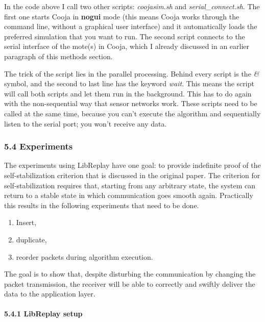 In the code above I call two other scripts: \emph{coojasim.sh} and
\emph{serial\_connect.sh}. The first one starts Cooja in \textbf{nogui}
mode (this means Cooja works through the command line, without a
graphical user interface) and it automatically loads the preferred
simulation that you want to run. The second script connects to the
serial interface of the mote(s) in Cooja, which I already discussed in
an earlier paragraph of this methods section.

The trick of the script lies in the parallel processing. Behind every
script is the \emph{\&} symbol, and the second to last line has the
keyword \emph{wait}. This means the script will call both scripts and
let them run in the background. This has to do again with the
non-sequential way that sensor networks work. These scripts need to be
called at the same time, because you can't execute the algorithm and
sequentially listen to the serial port; you won't receive any data.

\subsubsection{5.4 Experiments}\label{experiments}

The experiments using LibReplay have one goal: to provide indefinite
proof of the self-stabilization criterion that is discussed in the
original paper. The criterion for self-stabilization requires that,
starting from any arbitrary state, the system can return to a stable
state in which communication goes smooth again. Practically this results
in the following experiments that need to be done.

\begin{enumerate}
\def\labelenumi{\arabic{enumi}.}
\itemsep1pt\parskip0pt
\item
  Insert,
\item
  duplicate,
\item
  reorder packets during algorithm execution.
\end{enumerate}

The goal is to show that, despite disturbing the communication by
changing the packet transmission, the receiver will be able to correctly
and swiftly deliver the data to the application layer.

\paragraph{5.4.1 LibReplay setup\\\\}\label{libreplay-setup}

